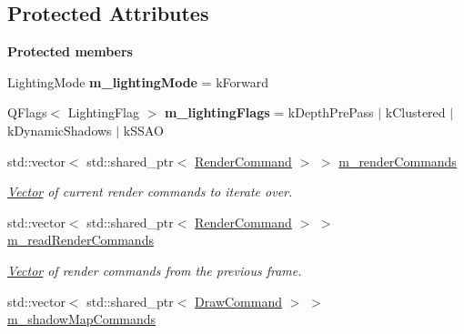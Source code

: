 \subsection*{Protected Attributes}
\begin{Indent}\textbf{ Protected members}\par
\begin{DoxyCompactItemize}
\item 
\mbox{\label{classrev_1_1_main_renderer_ab3093efbd0e2653ef268451531601bbc}} 
Lighting\+Mode {\bfseries m\+\_\+lighting\+Mode} = k\+Forward
\item 
\mbox{\label{classrev_1_1_main_renderer_a840c9d82f6acd066c43d236c302ad1ed}} 
Q\+Flags$<$ Lighting\+Flag $>$ {\bfseries m\+\_\+lighting\+Flags} = k\+Depth\+Pre\+Pass $\vert$ k\+Clustered $\vert$ k\+Dynamic\+Shadows $\vert$ k\+S\+S\+AO
\item 
\mbox{\label{classrev_1_1_main_renderer_a54326d5cbed38d56a4a0f74f6f53f3a6}} 
std\+::vector$<$ std\+::shared\+\_\+ptr$<$ \mbox{\hyperlink{classrev_1_1_render_command}{Render\+Command}} $>$ $>$ \mbox{\hyperlink{classrev_1_1_main_renderer_a54326d5cbed38d56a4a0f74f6f53f3a6}{m\+\_\+render\+Commands}}
\begin{DoxyCompactList}\small\item\em \mbox{\hyperlink{classrev_1_1_vector}{Vector}} of current render commands to iterate over. \end{DoxyCompactList}\item 
\mbox{\label{classrev_1_1_main_renderer_aaf8d617a3be54416ae540ca39246fe5c}} 
std\+::vector$<$ std\+::shared\+\_\+ptr$<$ \mbox{\hyperlink{classrev_1_1_render_command}{Render\+Command}} $>$ $>$ \mbox{\hyperlink{classrev_1_1_main_renderer_aaf8d617a3be54416ae540ca39246fe5c}{m\+\_\+read\+Render\+Commands}}
\begin{DoxyCompactList}\small\item\em \mbox{\hyperlink{classrev_1_1_vector}{Vector}} of render commands from the previous frame. \end{DoxyCompactList}\item 
\mbox{\label{classrev_1_1_main_renderer_ace19d9d76255dfcbe992cf2350165bc2}} 
std\+::vector$<$ std\+::shared\+\_\+ptr$<$ \mbox{\hyperlink{classrev_1_1_draw_command}{Draw\+Command}} $>$ $>$ \mbox{\hyperlink{classrev_1_1_main_renderer_ace19d9d76255dfcbe992cf2350165bc2}{m\+\_\+shadow\+Map\+Commands}}

\end{DoxyCompactItemize}
\end{Indent}
